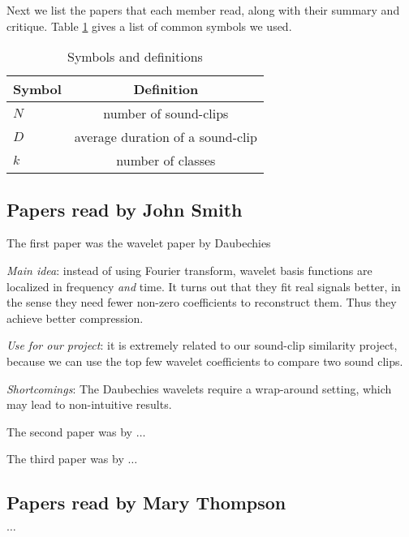 Next we list the papers that each member read,
along with their summary and critique.
Table \ref{tab:symbols} gives a list of common symbols we used.

\begin{table}[htb]
\begin{center} 
\begin{tabular}{|l | c | } \hline \hline 
Symbol & Definition \\ \hline
$N$ & number of sound-clips \\
$D$ & average duration of a sound-clip \\
$k$  & number of classes \\ \hline
\end{tabular} 
\end{center} 
\caption{Symbols and definitions}
\label{tab:symbols} 
 \end{table} 


\subsection{Papers read by John Smith}
The first paper was the wavelet paper by Daubechies
\cite{Daubechies92Ten}
\begin{itemize*}
\item {\em Main idea}: instead of using Fourier transform,
      wavelet basis functions are localized in frequency {\em and} time.
      It turns out that they fit real signals better,
      in the sense they need fewer non-zero coefficients to reconstruct
      them. Thus they achieve better compression.
\item {\em Use for our project}:
      it is extremely related to our sound-clip similarity
      project, because we can use the top few wavelet coefficients
      to compare two sound clips.
\item {\em Shortcomings}:
      The Daubechies wavelets require a wrap-around setting,
      which may lead to non-intuitive results.
\end{itemize*}

The second paper was by $\ldots$

The third paper was by $\ldots$

\subsection{Papers read by Mary Thompson }

$\ldots$

